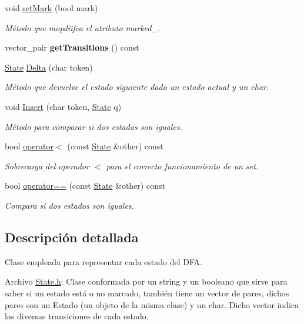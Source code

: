 \begin{DoxyCompactItemize}
void \hyperlink{classState_af07f99f41c5c3dc6154ccf420cdbbe27}{set\+Mark} (bool mark)
\begin{DoxyCompactList}\small\item\em Método que mopdiifca el atributo marked\+\_\+. \end{DoxyCompactList}\item 
\mbox{\label{classState_af017b8887a998fa922ae114642509860}} 
vector\+\_\+pair {\bfseries get\+Transitions} () const
\item 
\hyperlink{classState}{State} \hyperlink{classState_a02357cf169ab1d60222aa97997fecdbd}{Delta} (char token)
\begin{DoxyCompactList}\small\item\em Método que devuelve el estado siguiente dado un estado actual y un char. \end{DoxyCompactList}\item 
void \hyperlink{classState_a890e208099230b4ff3b6bafe215d94d6}{Insert} (char token, \hyperlink{classState}{State} q)
\begin{DoxyCompactList}\small\item\em Método para comparar si dos estados son iguales. \end{DoxyCompactList}\item 
bool \hyperlink{classState_a04827418cf8fd791b7f7e7f9a1f23a55}{operator$<$} (const \hyperlink{classState}{State} \&other) const
\begin{DoxyCompactList}\small\item\em Sobrecarga del operador $<$ para el correcto funcionamiento de un set. \end{DoxyCompactList}\item 
bool \hyperlink{classState_ab98d310aaceb21737346521c5bc6fc6c}{operator==} (const \hyperlink{classState}{State} \&other) const
\begin{DoxyCompactList}\small\item\em Compara si dos estados son iguales. \end{DoxyCompactList}\end{DoxyCompactItemize}


\subsection{Descripción detallada}
Clase empleada para representar cada estado del D\+FA. 

Archivo \hyperlink{State_8h_source}{State.\+h}\+: Clase conformada por un string y un booleano que sirve para saber si un estado está o no marcado, también tiene un vector de pares, dichos pares son un Estado (un objeto de la misma clase) y un char. Dicho vector indica las diversas transiciones de cada estado.

